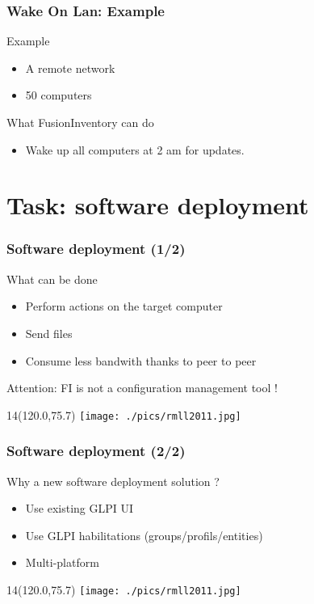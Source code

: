 \documentclass{beamer}
\newcommand{\WorkInProgress}{%
\begin{textblock}{14}(120.0,75.7)
\texttt{[image: ./pics/rmll2011.jpg]}
\end{textblock}
  }
\begin{document}
\begin{frame}
    \frametitle{Wake On Lan: Example}

    \begin{block}{Example}
    \begin{itemize}
    \item A remote network
    \item 50 computers
    \end{itemize}
    \end{block}


    \begin{block}{What FusionInventory can do}
    \begin{itemize}
    \item Wake up all computers at 2 am for updates.
    \end{itemize}
    \end{block}

\end{frame}


\section{Task: software deployment}

\begin{frame}
    \frametitle{Software deployment (1/2)}

    \begin{block}{What can be done}
    \begin{itemize}
        \item Perform actions on the target computer
        \item Send files
        \item Consume less bandwith thanks to peer to peer
    \end{itemize}
    Attention: FI is not a configuration management tool !
    \end{block}

\WorkInProgress
\end{frame}

\begin{frame}
    \frametitle{Software deployment (2/2)}

    \begin{block}{Why a new software deployment solution ?}
    \begin{itemize}
        \item Use existing GLPI UI
        \item Use GLPI habilitations (groups/profils/entities)
        \item Multi-platform
    \end{itemize}
    \end{block}

\WorkInProgress
\end{frame}
\end{document}
